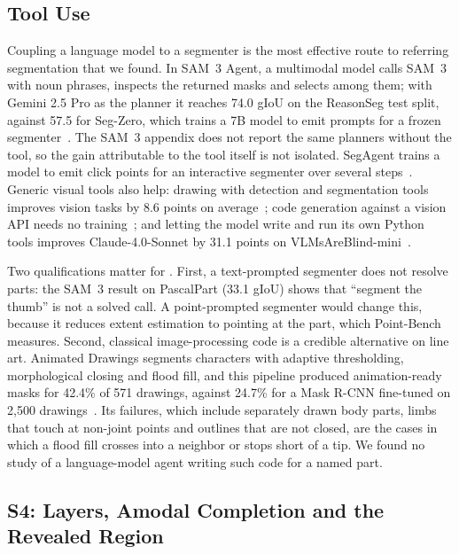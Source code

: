 \subsection{Tool Use}
\label{sec:cutout-tools}

Coupling a language model to a segmenter is the most effective route to referring segmentation that we found. In SAM~3 Agent, a multimodal model calls SAM~3 with noun phrases, inspects the returned masks and selects among them; with Gemini 2.5 Pro as the planner it reaches 74.0 gIoU on the ReasonSeg test split, against 57.5 for Seg-Zero, which trains a 7B model to emit prompts for a frozen segmenter~\citep{carion2025sam3,liu2025segzero}. The SAM~3 appendix does not report the same planners without the tool, so the gain attributable to the tool itself is not isolated. SegAgent trains a model to emit click points for an interactive segmenter over several steps~\citep{zhu2025segagent}. Generic visual tools also help: drawing with detection and segmentation tools improves vision tasks by 8.6 points on average~\citep{hu2024sketchpad}; code generation against a vision API needs no training~\citep{suris2023vipergpt}; and letting the model write and run its own Python tools improves Claude-4.0-Sonnet by 31.1 points on VLMsAreBlind-mini~\citep{zhao2025pyvision}.

Two qualifications matter for \anibench{}. First, a text-prompted segmenter does not resolve parts: the SAM~3 result on PascalPart (33.1 gIoU) shows that ``segment the thumb'' is not a solved call. A point-prompted segmenter would change this, because it reduces extent estimation to pointing at the part, which Point-Bench measures. Second, classical image-processing code is a credible alternative on line art. Animated Drawings segments characters with adaptive thresholding, morphological closing and flood fill, and this pipeline produced animation-ready masks for 42.4\% of 571 drawings, against 24.7\% for a Mask R-CNN fine-tuned on 2{,}500 drawings~\citep{smith2023animateddrawings}. Its failures, which include separately drawn body parts, limbs that touch at non-joint points and outlines that are not closed, are the cases in which a flood fill crosses into a neighbor or stops short of a tip. We found no study of a language-model agent writing such code for a named part.

\subsection{S4: Layers, Amodal Completion and the Revealed Region}
\label{sec:cutout-fill}

